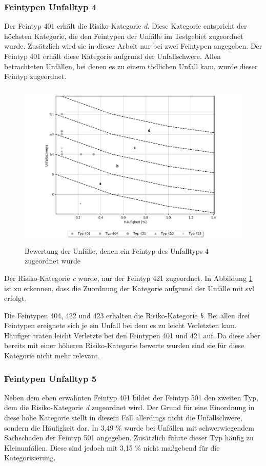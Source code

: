\subsubsection{Feintypen Unfalltyp 4}
Der Feintyp 401 erhält die Risiko-Kategorie \textit{d}. Diese Kategorie entspricht der höchsten Kategorie, die den Feintypen der Unfälle im Testgebiet zugeordnet wurde. Zusätzlich wird sie in dieser Arbeit nur bei zwei Feintypen angegeben. Der Feintyp 401 erhält diese Kategorie aufgrund der Unfallschwere. Allen betrachteten Unfällen, bei denen es zu einem tödlichen Unfall kam, wurde dieser Feintyp zugeordnet.

\begin{savenotes}
	\begin{figure}[H]
		\centering
		\includegraphics[width=12cm,height=8cm]{figures/Bewertung_FT4}
		\caption[Bewertung der Unfälle, denen ein Feintyp des Unfalltyps 4 zugeordnet wurde]{Bewertung der Unfälle, denen ein Feintyp des Unfalltyps 4 zugeordnet wurde}\label{fig:Bewertung_FT4}
	\end{figure}
\end{savenotes}

Der Risiko-Kategorie \textit{c} wurde, nur der Feintyp 421 zugeordnet. In Abbildung \ref{fig:Bewertung_FT4} ist zu erkennen, dass die Zuordnung der Kategorie aufgrund der Unfälle mit \ac{svl} erfolgt.

Die Feintypen 404, 422 und 423 erhalten die Risiko-Kategorie \textit{b}. Bei allen drei Feintypen ereignete sich je ein Unfall bei dem es zu leicht Verletzten kam. Häufiger traten leicht Verletzte bei den Feintypen 401 und 421 auf. Da diese aber bereits mit einer höheren Risiko-Kategorie bewerte wurden sind sie für diese Kategorie nicht mehr relevant.

\subsubsection{Feintypen Unfalltyp 5}
Neben dem eben erwähnten Feintyp 401 bildet der Feintyp 501 den zweiten Typ, dem die Risiko-Kategorie \textit{d} zugeordnet wird. Der Grund für eine Einordnung in diese hohe Kategorie stellt in diesem Fall allerdings nicht die Unfallschwere, sondern die Häufigkeit dar. In 3,49 \% wurde bei Unfällen mit schwerwiegendem Sachschaden der Feintyp 501 angegeben. Zusätzlich führte dieser Typ häufig zu Kleinunfällen. Diese sind jedoch mit 3,15 \% nicht maßgebend für die Kategorisierung.

